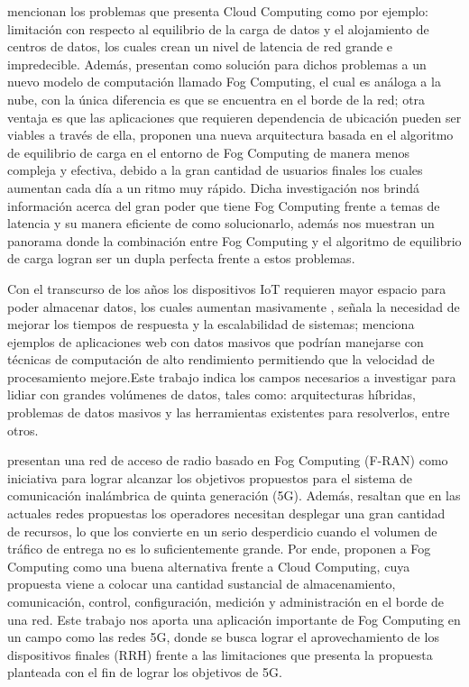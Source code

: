         \vskip 0.3cm
        {\cite{verma2015}} mencionan los problemas que presenta Cloud Computing como por ejemplo: limitación con respecto al equilibrio de la carga de datos y el alojamiento de centros de datos, los cuales crean un nivel de latencia de red grande e impredecible. Además, presentan como solución para dichos problemas a un nuevo modelo de computación llamado Fog Computing, el cual es análoga a la nube, con la única diferencia es que se encuentra en el borde de la red; otra ventaja es que las aplicaciones que requieren dependencia de ubicación pueden ser viables a través de ella, proponen una nueva arquitectura basada en el algoritmo de equilibrio de carga en el entorno de Fog Computing de manera menos compleja y efectiva, debido a la gran cantidad de usuarios finales los cuales aumentan cada día a un ritmo muy rápido. Dicha investigación nos brindá información acerca del gran poder que tiene Fog Computing frente a temas de latencia y su manera eficiente de como solucionarlo, además nos muestran un panorama donde la combinación entre Fog Computing y el algoritmo de equilibrio de carga logran ser un dupla perfecta frente a estos problemas.\par
        \vskip 0.3cm
        Con el transcurso de los años los dispositivos IoT requieren mayor espacio para poder almacenar datos, los cuales aumentan masivamente {\citep{murazzo2017}}, señala la necesidad de mejorar los tiempos de respuesta y la escalabilidad de sistemas; menciona ejemplos de aplicaciones web con datos masivos que podrían manejarse con técnicas de computación de alto rendimiento permitiendo que la velocidad de procesamiento mejore.Este trabajo indica los campos necesarios a investigar para lidiar con grandes volúmenes de datos, tales como: arquitecturas híbridas, problemas de datos masivos y las herramientas existentes para resolverlos, entre otros.\par
        \vskip 0.3cm
        {\cite{mugen2015}} presentan una red de acceso de radio basado en Fog Computing (F-RAN) como iniciativa para lograr alcanzar los objetivos propuestos para el sistema de comunicación inalámbrica de quinta generación (5G). Además, resaltan que en las actuales redes propuestas los operadores necesitan desplegar una gran cantidad de recursos, lo que los convierte en un serio desperdicio cuando el volumen de tráfico de entrega no es lo suficientemente grande. Por ende, proponen a Fog Computing como una buena alternativa frente a Cloud Computing, cuya propuesta viene a colocar una cantidad sustancial de almacenamiento, comunicación, control, configuración, medición y administración en el borde de una red. Este trabajo nos aporta una aplicación importante de Fog Computing en un campo como las redes 5G, donde se busca lograr el aprovechamiento de los dispositivos finales (RRH) frente a las limitaciones que presenta la propuesta planteada con el fin de lograr los objetivos de 5G.\par     
